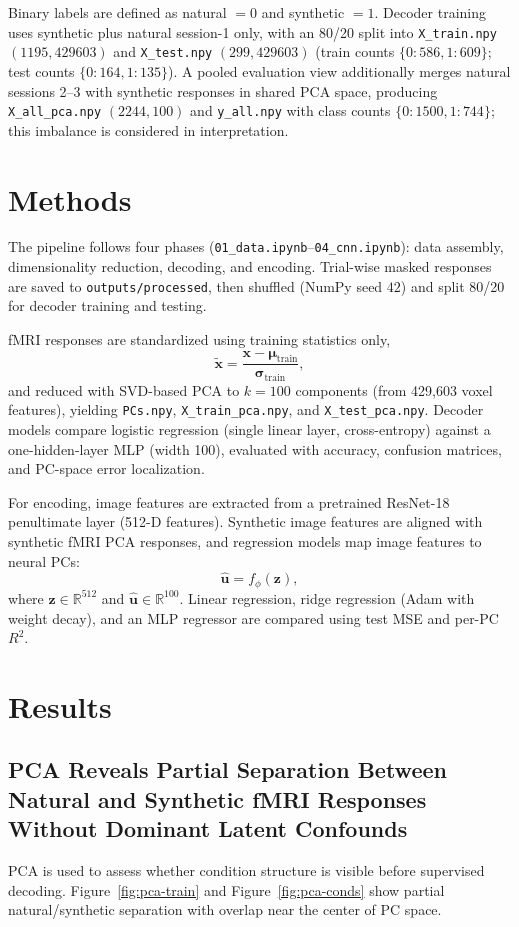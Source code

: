 \documentclass[11pt]{article}
\begin{document}
Binary labels are defined as natural $=0$ and synthetic $=1$. Decoder training uses synthetic plus natural session-1 only, with an 80/20 split into \texttt{X\_train.npy} $(1195,429603)$ and \texttt{X\_test.npy} $(299,429603)$ (train counts $\{0:586,1:609\}$; test counts $\{0:164,1:135\}$). A pooled evaluation view additionally merges natural sessions 2--3 with synthetic responses in shared PCA space, producing \texttt{X\_all\_pca.npy} $(2244,100)$ and \texttt{y\_all.npy} with class counts $\{0:1500,1:744\}$; this imbalance is considered in interpretation.

\section{Methods}
The pipeline follows four phases (\texttt{01\_data.ipynb}--\texttt{04\_cnn.ipynb}): data assembly, dimensionality reduction, decoding, and encoding. Trial-wise masked responses are saved to \texttt{outputs/processed}, then shuffled (NumPy seed $42$) and split 80/20 for decoder training and testing.

fMRI responses are standardized using training statistics only,
$$
\tilde{\mathbf{x}} = \frac{\mathbf{x}-\boldsymbol{\mu}_{\text{train}}}{\boldsymbol{\sigma}_{\text{train}}},
$$
and reduced with SVD-based PCA to $k=100$ components (from 429,603 voxel features), yielding \texttt{PCs.npy}, \texttt{X\_train\_pca.npy}, and \texttt{X\_test\_pca.npy}. Decoder models compare logistic regression (single linear layer, cross-entropy) against a one-hidden-layer MLP (width 100), evaluated with accuracy, confusion matrices, and PC-space error localization.

For encoding, image features are extracted from a pretrained ResNet-18 penultimate layer (512-D features). Synthetic image features are aligned with synthetic fMRI PCA responses, and regression models map image features to neural PCs:
$$
\hat{\mathbf{u}} = f_{\phi}(\mathbf{z}),
$$
where $\mathbf{z} \in \mathbb{R}^{512}$ and $\hat{\mathbf{u}} \in \mathbb{R}^{100}$. Linear regression, ridge regression (Adam with weight decay), and an MLP regressor are compared using test MSE and per-PC $R^2$.

\FloatBarrier
\section{Results}
\subsection*{PCA Reveals Partial Separation Between Natural and Synthetic fMRI Responses Without Dominant Latent Confounds}
PCA is used to assess whether condition structure is visible before supervised decoding. Figure~\ref{fig:pca-train} and Figure~\ref{fig:pca-conds} show partial natural/synthetic separation with overlap near the center of PC space.
\end{document}
